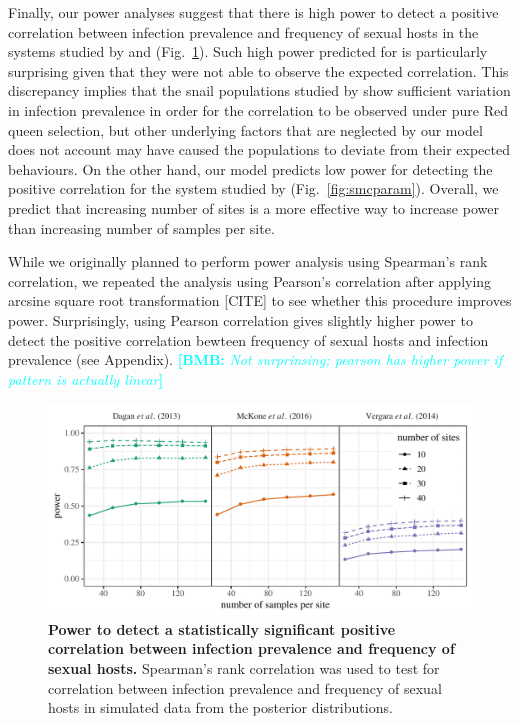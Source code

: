 \documentclass{article}\usepackage[]{graphicx}\usepackage[]{color}
\newcommand{\comment}[3]{\textcolor{#1}{\textbf{[#2: }\textit{#3}\textbf{]}}}
\newcommand{\bmb}[1]{\comment{cyan}{BMB}{#1}}
\newcommand{\fref}[1]{Fig.~\ref{fig:#1}}
\begin{document}
Finally, our power analyses suggest that there is high power to detect a positive correlation between infection prevalence and frequency of sexual hosts in the systems studied by \cite{dagan2013clonal} and \cite{mckone2016fine} (\fref{power}).
Such high power predicted for \cite{dagan2013clonal} is particularly surprising given that they were not able to observe the expected correlation.
This discrepancy implies that the snail populations studied by \cite{dagan2013clonal} show sufficient variation in infection prevalence in order for the correlation to be observed under pure Red queen selection, but other underlying factors that are neglected by our model does not account may have caused the populations to deviate from their expected behaviours.
On the other hand, our model predicts low power for detecting the positive correlation for the system studied by \cite{vergara2014infection} (\fref{smcparam}).
Overall, we predict that increasing number of sites is a more effective way to increase power than increasing number of samples per site.

While we originally planned to perform power analysis using Spearman's rank correlation,
we repeated the analysis using Pearson's correlation after applying arcsine square root transformation [CITE] to see whether this procedure improves power.
Surprisingly, using Pearson correlation gives slightly higher power to detect the positive correlation bewteen frequency of sexual hosts and infection prevalence (see Appendix).
\bmb{Not surprinsing; pearson has higher power if pattern is actually linear}

\begin{figure}[!ht]
\includegraphics[width=\textwidth]{../fig/power.pdf}
\caption{{\bf Power to detect a statistically significant positive correlation between infection prevalence and frequency of sexual hosts.}
Spearman's rank correlation was used to test for correlation between infection prevalence and frequency of sexual hosts in simulated data from the posterior distributions.
}
\label{fig:power}
\end{figure}
\end{document}
